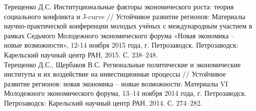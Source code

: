 \documentclass[10pt]{article}
\newcommand{\years}[1]{\marginnote{\scriptsize #1}}
\begin{document}
\years{2015}Терещенко Д.С. Институциональные факторы экономического роста: теория социального конфликта и J-curve // Устойчивое развитие регионов: Материалы научно-практической конференции молодых учёных с международным участием в рамках Седьмого Молодежного экономического форума «Новая экономика – новые возможности», 12-14 ноября 2015 года, г. Петрозаводск. Петрозаводск: Карельский научный центр РАН, 2015. С. 238–248.\\
\years{2014}Терещенко Д.С., Щербаков В.С. Региональные политические и экономические институты и их воздействие на инвестиционные процессы // Устойчивое развитие регионов: новая экономика – новые возможности: Материалы VI Молодежного экономического форума, 13–14 ноября 2014 года, г. Петрозаводск. Петрозаводск: Карельский научный центр РАН, 2014. С. 274–282.\\
\end{document}
